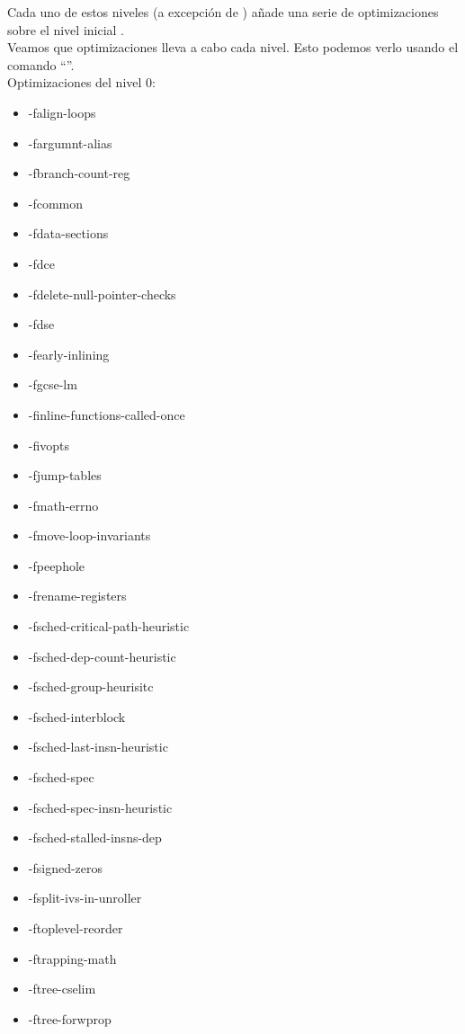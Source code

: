 Cada uno de estos niveles (a excepción de ) añade una serie de optimizaciones sobre el nivel inicial .\\
Veamos que optimizaciones lleva a cabo cada nivel. Esto podemos verlo usando el comando ``''.\\
\newline
Optimizaciones del nivel 0:
\begin{multicols}{2}
\begin{itemize}[noitemsep, topsep=0pt, parsep=0pt, partopsep=0pt]
	\item -falign-loops
	\item -fargumnt-alias
	\item -fbranch-count-reg
	\item -fcommon
	\item -fdata-sections
	\item -fdce
	\item -fdelete-null-pointer-checks
	\item -fdse
	\item -fearly-inlining
	\item -fgcse-lm
	\item -finline-functions-called-once
	\item -fivopts
	\item -fjump-tables
	\item -fmath-errno
	\item -fmove-loop-invariants
	\item -fpeephole
	\item -frename-registers
	\item -fsched-critical-path-heuristic
	\item -fsched-dep-count-heuristic
	\item -fsched-group-heurisitc
	\item -fsched-interblock
	\item -fsched-last-insn-heuristic
	\item -fsched-spec
	\item -fsched-spec-insn-heuristic
	\item -fsched-stalled-insns-dep
	\item -fsigned-zeros
	\item -fsplit-ivs-in-unroller
	\item -ftoplevel-reorder
	\item -ftrapping-math
	\item -ftree-cselim
	\item -ftree-forwprop

\end{itemize}
\end{multicols}

